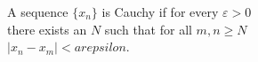 \documentclass[preview]{standalone}
\begin{document}
\begin{center}
A sequence $\{x_n\}$ is Cauchy if for every $\varepsilon > 0$\\there exists an $N$\in {} such that for all $m, n \geq N$\\$\left| x_n - x_m \right| <$$arepsilon$.
\end{center}
\end{document}
